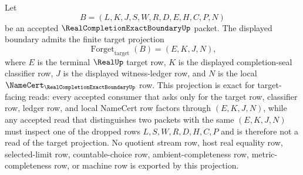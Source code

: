 \begin{lemma}
\label{lem:real-completion-exact-boundary-forgetful-projection}
Let
$$
B=(L,K,J,S,W,R,D,E,H,C,P,N)
$$
be an accepted $\RealCompletionExactBoundaryUp$ packet. The displayed boundary admits the finite target projection
$$
\operatorname{Forget}_{\mathrm{target}}(B)=(E,K,J,N),
$$
where $E$ is the terminal $\RealUp$ target row, $K$ is the displayed completion-seal classifier row, $J$ is the displayed witness-ledger row, and $N$ is the local $\NameCert_{\RealCompletionExactBoundaryUp}$ row. This projection is exact for target-facing reads: every accepted consumer that asks only for the target row, classifier row, ledger row, and local NameCert row factors through $(E,K,J,N)$, while any accepted read that distinguishes two packets with the same $(E,K,J,N)$ must inspect one of the dropped rows $L,S,W,R,D,H,C,P$ and is therefore not a read of the target projection. No quotient stream row, host real equality row, selected-limit row, countable-choice row, ambient-completeness row, metric-completeness row, or machine row is exported by this projection.
\end{lemma}
